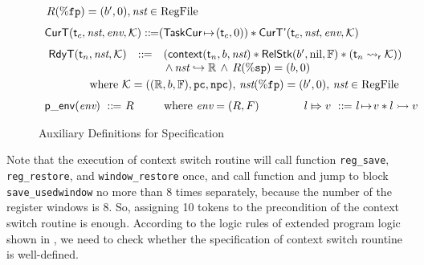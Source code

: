 \begin{figure}[!t]
\[\begin{array}{l}
            \, \RFile(\fpreg) = (\block', 0), \nst \in \text{RegFile} \\
            \\[-5pt]
            \RelCurT{\thrdid_c}{\nst}{\env}{\hthrdlocalst} \define 
            (\msto{\TaskCur}{(\thrdid_c, 0)}) \sepstar 
            \RelCurTAux{\thrdid_c}{\nst}{\env}{\hthrdlocalst} \\
            \\[-5pt]
            \hspace*{-0.15em}
            \begin{array}{lll}
                \RelRdyT{\thrdid_n}{\nst}{\hthrdlocalst} & \define & 
                (\relcontext{\thrdid_n}{\block}{\nst}
                \sepstar 
                \RelStk{\block'}{\nil}{\hWstk} \sepstar 
                (\astRdyCont{\thrdid_n}{\hthrdlocalst})) \\
                & &  
                \, \land \, 
                \Rinj{\nst}{\hRfile} \, \land \, \RFile(\spreg) = (\block, 0)
            \end{array}  \\
            \\[-9pt]
            \qquad\qquad
            \text{where} \ \hthrdlocalst = ((\hRfile, \block, \hWstk), \pc, \npc), 
            \, \nst(\fpreg) = (\block', 0), \, \nst \in \text{RegFile} \\
            \\[-5pt]
            \pEnv{\env} \ \define \ \RFile \qquad \ \ \text{where} \ \env = (\RFile, \Wstack)
            \qquad\qquad
            \relmsto{\loc}{\val} \ \define \ 
            \msto{\loc}{\val} \sepstar \hmsto{\loc}{\val} 
        \end{array}
    \]
    \caption{Auxiliary Definitions for Specification}
    \label{def:aux-def-spec}
\end{figure}

Note that the execution of context switch routine will 
call function \texttt{reg\_save}, \texttt{reg\_restore}, and  
\texttt{window\_restore} once, and call function  
and jump to block \texttt{save\_usedwindow} no more than 8 times separately, 
because the number of the register windows is 8. So, assigning 10 tokens 
to the precondition of the context switch routine is enough. 
According to the logic rules of extended program logic shown 
in \Fig{\ref{fig:Selected Inference Rules for Refinement Verification}}, 
we need to check whether the specification of context switch rountine 
is well-defined. 

